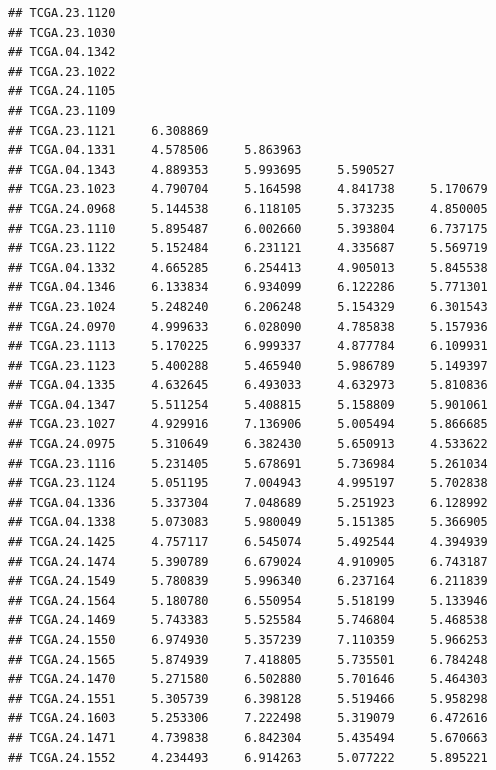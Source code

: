 \documentclass[UTF8]{beamer}\usepackage[]{graphicx}\usepackage[]{color}
\makeatletter
\newenvironment{kframe}{%
 \def\at@end@of@kframe{}%
 \ifinner\ifhmode%
  \def\at@end@of@kframe{\end{minipage}}%
  \begin{minipage}{\columnwidth}%
 \fi\fi%
 \def\FrameCommand##1{\hskip\@totalleftmargin \hskip-\fboxsep
 \colorbox{shadecolor}{##1}\hskip-\fboxsep
     \hskip-\linewidth \hskip-\@totalleftmargin \hskip\columnwidth}%
 \MakeFramed {\advance\hsize-\width
   \@totalleftmargin\z@ \linewidth\hsize
   \@setminipage}}%
 {\par\unskip\endMakeFramed%
 \at@end@of@kframe}
\newenvironment{knitrout}{}{} %
\makeatother
\begin{document}
\begin{frame}[fragile]
\begin{knitrout}
\begin{kframe}
\begin{verbatim}
## TCGA.23.1120                                                    
## TCGA.23.1030                                                    
## TCGA.04.1342                                                    
## TCGA.23.1022                                                    
## TCGA.24.1105                                                    
## TCGA.23.1109                                                    
## TCGA.23.1121     6.308869                                       
## TCGA.04.1331     4.578506     5.863963                          
## TCGA.04.1343     4.889353     5.993695     5.590527             
## TCGA.23.1023     4.790704     5.164598     4.841738     5.170679
## TCGA.24.0968     5.144538     6.118105     5.373235     4.850005
## TCGA.23.1110     5.895487     6.002660     5.393804     6.737175
## TCGA.23.1122     5.152484     6.231121     4.335687     5.569719
## TCGA.04.1332     4.665285     6.254413     4.905013     5.845538
## TCGA.04.1346     6.133834     6.934099     6.122286     5.771301
## TCGA.23.1024     5.248240     6.206248     5.154329     6.301543
## TCGA.24.0970     4.999633     6.028090     4.785838     5.157936
## TCGA.23.1113     5.170225     6.999337     4.877784     6.109931
## TCGA.23.1123     5.400288     5.465940     5.986789     5.149397
## TCGA.04.1335     4.632645     6.493033     4.632973     5.810836
## TCGA.04.1347     5.511254     5.408815     5.158809     5.901061
## TCGA.23.1027     4.929916     7.136906     5.005494     5.866685
## TCGA.24.0975     5.310649     6.382430     5.650913     4.533622
## TCGA.23.1116     5.231405     5.678691     5.736984     5.261034
## TCGA.23.1124     5.051195     7.004943     4.995197     5.702838
## TCGA.04.1336     5.337304     7.048689     5.251923     6.128992
## TCGA.04.1338     5.073083     5.980049     5.151385     5.366905
## TCGA.24.1425     4.757117     6.545074     5.492544     4.394939
## TCGA.24.1474     5.390789     6.679024     4.910905     6.743187
## TCGA.24.1549     5.780839     5.996340     6.237164     6.211839
## TCGA.24.1564     5.180780     6.550954     5.518199     5.133946
## TCGA.24.1469     5.743383     5.525584     5.746804     5.468538
## TCGA.24.1550     6.974930     5.357239     7.110359     5.966253
## TCGA.24.1565     5.874939     7.418805     5.735501     6.784248
## TCGA.24.1470     5.271580     6.502880     5.701646     5.464303
## TCGA.24.1551     5.305739     6.398128     5.519466     5.958298
## TCGA.24.1603     5.253306     7.222498     5.319079     6.472616
## TCGA.24.1471     4.739838     6.842304     5.435494     5.670663
## TCGA.24.1552     4.234493     6.914263     5.077222     5.895221

\end{verbatim}
\end{kframe}
\end{knitrout}
\end{frame}
\end{document}

